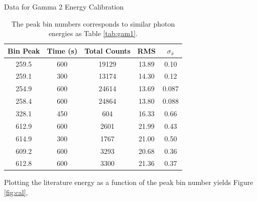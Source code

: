 \documentclass[10pt]{IEEEtran}
\begin{document}
    \begin{table}[!hbpt]
        \begin{center}
          \begin{normalsize}Data for Gamma 2 Energy Calibration\end{normalsize}
          \begin{tabular}{|c|c|c|c|c|}
			\hline        	
        	Bin Peak & Time (s) & Total Counts & RMS & $\sigma_{\bar{x}}$ \\    
            \hline
            259.5 & 600 & 19129 & 13.89 & 0.10 \\
            \hline
            259.1 & 300 & 13174 & 14.30 & 0.12 \\
            \hline
            254.9 & 600 & 24614 & 13.69 & 0.087 \\
            \hline
            258.4 & 600 & 24864 & 13.80 & 0.088 \\
            \hline
            328.1 & 450 & 604 & 16.33 & 0.66 \\
            \hline
            612.9 & 600 & 2601 & 21.99 & 0.43 \\
            \hline
            614.9 & 300 & 1767 & 21.00 & 0.50 \\
            \hline
            609.2 & 600 & 3293 & 20.68 & 0.36 \\
            \hline
            612.8 & 600 & 3300 & 21.36 & 0.37 \\
            \hline
          \end{tabular}
          \caption{The peak bin numbers corresponds to similar photon energies as Table \ref{tab:gam1}.}
          \label{tab:gam2}
       \end{center}
    \end{table}    

    Plotting the literature energy\cite{sonzogni} as a function of the peak bin number yields Figure \ref{fig:cal},
   
\end{document}

